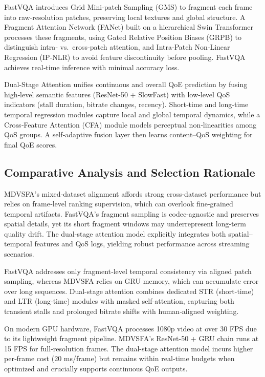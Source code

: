 FastVQA \cite{wu2022fastvqa} introduces Grid Mini‐patch Sampling (GMS) to fragment each frame into raw‐resolution patches, preserving local textures and global structure. A Fragment Attention Network (FANet) built on a hierarchical Swin Transformer processes these fragments, using Gated Relative Position Biases (GRPB) to distinguish intra‐ vs.\ cross‐patch attention, and Intra‐Patch Non‐Linear Regression (IP-NLR) to avoid feature discontinuity before pooling. FastVQA achieves real‐time inference with minimal accuracy loss.  

Dual-Stage Attention \cite{jia2024continuous} unifies continuous and overall QoE prediction by fusing high‐level semantic features (ResNet-50 + SlowFast) with low‐level QoS indicators (stall duration, bitrate changes, recency). Short‐time and long‐time temporal regression modules capture local and global temporal dynamics, while a Cross‐Feature Attention (CFA) module models perceptual non‐linearities among QoS groups. A self‐adaptive fusion layer then learns content–QoS weighting for final QoE scores.

\subsection{Comparative Analysis and Selection Rationale}  
MDVSFA’s mixed‐dataset alignment affords strong cross‐dataset performance but relies on frame‐level ranking supervision, which can overlook fine‐grained temporal artifacts. FastVQA’s fragment sampling is codec-agnostic and preserves spatial details, yet its short fragment windows may underrepresent long‐term quality drift. The dual-stage attention model explicitly integrates both spatial–temporal features and QoS logs, yielding robust performance across streaming scenarios.  

FastVQA addresses only fragment‐level temporal consistency via aligned patch sampling, whereas MDVSFA relies on GRU memory, which can accumulate error over long sequences. Dual-stage attention combines dedicated STR (short-time) and LTR (long-time) modules with masked self‐attention, capturing both transient stalls and prolonged bitrate shifts with human‐aligned weighting.  

On modern GPU hardware, FastVQA processes 1080p video at over 30 FPS due to its lightweight fragment pipeline. MDVSFA’s ResNet-50 + GRU chain runs at 15 FPS for full‐resolution frames. The dual-stage attention model incurs higher per‐frame cost (20 ms/frame) but remains within real‐time budgets when optimized and crucially supports continuous QoE outputs.

